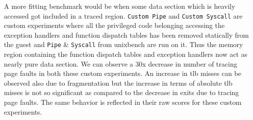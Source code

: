 A more fitting benchmark would be when some data section which is heavily accessed got included in a traced region. {\tt Custom Pipe} and {\tt Custom Syscall} are custom experiments where all the privileged code belonging accessing the exception handlers and function dispatch tables has been removed statically from the guest and {\tt Pipe} \& {\tt Syscall} from unixbench are run on it. Thus the memory region containing the function dispatch tables and exception handlers now act as nearly pure data section. We can observe a 30x decrease in number of tracing page faults in both these custom experiments. An increase in tlb misses can be observed also due to fragmentation but the increase in terms of absolute tlb misses is not so significant as compared to the decrease in exits due to tracing page faults. The same behavior is reflected in their raw scores for these custom experiments.

